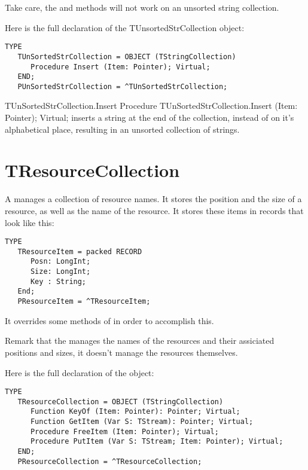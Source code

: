 Take care, the  and
 methods will not work on an unsorted
string collection.

Here is the full declaration of the {TUnsortedStrCollection} object:
\begin{verbatim}
TYPE
   TUnSortedStrCollection = OBJECT (TStringCollection)
      Procedure Insert (Item: Pointer); Virtual;
   END;
   PUnSortedStrCollection = ^TUnSortedStrCollection;
\end{verbatim}

\begin{procedure}{TUnSortedStrCollection.Insert}
\Declaration
Procedure TUnSortedStrCollection.Insert (Item: Pointer); Virtual;
\Description
{} inserts a string at the end of the collection, instead
of on it's alphabetical place, resulting in an unsorted collection of
strings. 
\Errors
\SeeAlso
\end{procedure}

\html{}

\section{TResourceCollection}
\label{se:TResourceCollection}

A  manages a collection of resource names. 
It stores the position and the size of a resource, as well as the name of
the resource. It stores these items in records that look like this:
\begin{verbatim}
TYPE
   TResourceItem = packed RECORD
      Posn: LongInt;
      Size: LongInt;
      Key : String;
   End;
   PResourceItem = ^TResourceItem;
\end{verbatim}

It overrides some methods of  in order to accomplish
this. 

Remark that the  manages the names of the
resources and their assiciated positions and sizes, it doesn't manage
the resources themselves.

Here is the full declaration of the  object:
\begin{verbatim}
TYPE
   TResourceCollection = OBJECT (TStringCollection)
      Function KeyOf (Item: Pointer): Pointer; Virtual;
      Function GetItem (Var S: TStream): Pointer; Virtual;
      Procedure FreeItem (Item: Pointer); Virtual;
      Procedure PutItem (Var S: TStream; Item: Pointer); Virtual;
   END;
   PResourceCollection = ^TResourceCollection;
\end{verbatim}

